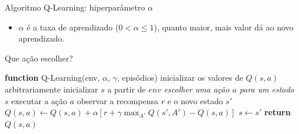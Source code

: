 \documentclass{beamer}
\begin{document}
%
%

\begin{frame}{Algoritmo Q-Learning: hiperparâmetro $\alpha$}
	\begin{itemize}
		\item $\alpha$ é a taxa de aprendizado ($0 < \alpha \leq 1$), quanto maior, mais valor dá ao novo aprendizado.
	\end{itemize}
\end{frame}

\begin{frame}{Que ação escolher?} 
	\small
	\begin{algorithmic} 
		\STATE \textbf{function} Q-Learning(env, $\alpha$, $\gamma$, episódios)
		\STATE inicializar os valores de $Q(s, a)$ arbitrariamente
		\STATE inicializar $s$ a partir de $env$
		\REPEAT
		\STATE \emph{escolher uma ação $a$ para um estado $s$}
		\STATE executar a ação $a$
		\STATE observar a recompensa $r$ e o novo estado $s'$ 
		\STATE $Q(s,a) \leftarrow Q(s,a) + \alpha [r +\gamma \max_{A'}{Q(s', A')} - Q(s,a)]$
		\STATE$s  \leftarrow s'$
		\ENDFOR
		\STATE \textbf{return} $Q(s, a)$
	\end{algorithmic}
\end{frame}
\end{document}
